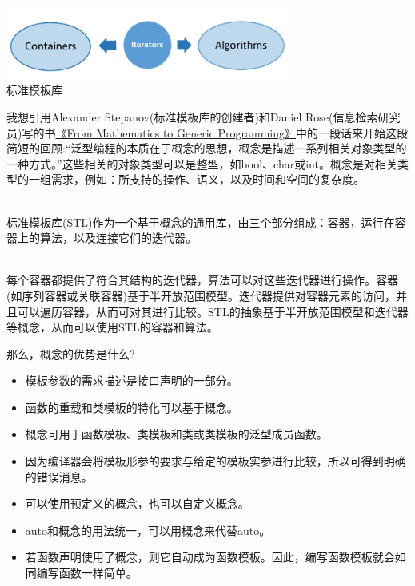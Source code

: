 \begin{center}
\includegraphics[width=0.7\textwidth]{content/3/chapter4/images/6.png}\\
标准模板库
\end{center}

\begin{tcolorbox}[breakable,enhanced jigsaw,colback=blue!5!white,colframe=blue!75!black,title={泛型编程的本质}]
我想引用Alexander Stepanov(标准模板库的创建者)和Daniel Rose(信息检索研究员)写的书\href{https://www.fm2gp.com/}{《From Mathematics to Generic Programming》}中的一段话来开始这段简短的回顾:“泛型编程的本质在于概念的思想，概念是描述一系列相关对象类型的一种方式。”这些相关的对象类型可以是整型，如bool、char或int。概念是对相关类型的一组需求，例如：所支持的操作、语义，以及时间和空间的复杂度。

\hspace*{\fill} \\ %
标准模板库(STL)作为一个基于概念的通用库，由三个部分组成：容器，运行在容器上的算法，以及连接它们的迭代器。

\hspace*{\fill} \\ %
每个容器都提供了符合其结构的迭代器，算法可以对这些迭代器进行操作。容器(如序列容器或关联容器)基于半开放范围模型。迭代器提供对容器元素的访问，并且可以遍历容器，从而可对其进行比较。STL的抽象基于半开放范围模型和迭代器等概念，从而可以使用STL的容器和算法。
\end{tcolorbox}

那么，概念的优势是什么?


\begin{itemize}
\item
模板参数的需求描述是接口声明的一部分。

\item
函数的重载和类模板的特化可以基于概念。

\item
概念可用于函数模板、类模板和类或类模板的泛型成员函数。

\item
因为编译器会将模板形参的要求与给定的模板实参进行比较，所以可得到明确的错误消息。

\item
可以使用预定义的概念，也可以自定义概念。

\item
auto和概念的用法统一，可以用概念来代替auto。

\item
若函数声明使用了概念，则它自动成为函数模板。因此，编写函数模板就会如同编写函数一样简单。
\end{itemize}


